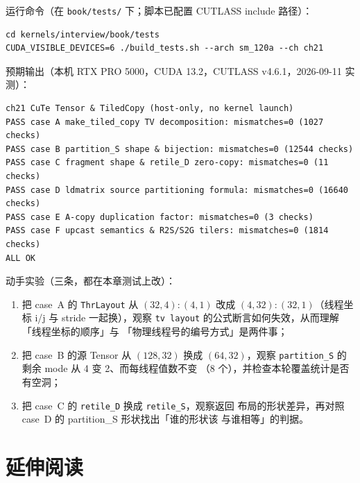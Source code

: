 运行命令（在 \texttt{book/tests/} 下；脚本已配置 CUTLASS include 路径）：

\begin{lstlisting}[style=console]
cd kernels/interview/book/tests
CUDA_VISIBLE_DEVICES=6 ./build_tests.sh --arch sm_120a --ch ch21
\end{lstlisting}

预期输出（本机 RTX PRO 5000，CUDA 13.2，CUTLASS v4.6.1，2026-09-11 实测）：

\begin{lstlisting}[style=console]
ch21 CuTe Tensor & TiledCopy (host-only, no kernel launch)
PASS case A make_tiled_copy TV decomposition: mismatches=0 (1027 checks)
PASS case B partition_S shape & bijection: mismatches=0 (12544 checks)
PASS case C fragment shape & retile_D zero-copy: mismatches=0 (11 checks)
PASS case D ldmatrix source partitioning formula: mismatches=0 (16640 checks)
PASS case E A-copy duplication factor: mismatches=0 (3 checks)
PASS case F upcast semantics & R2S/S2G tilers: mismatches=0 (1814 checks)
ALL OK
\end{lstlisting}

动手实验（三条，都在本章测试上改）：

\begin{enumerate}
  \item 把 case~A 的 \texttt{ThrLayout} 从 $(32,4){:}(4,1)$ 改成
        $(4,32){:}(32,1)$（线程坐标 i/j 与 stride 一起换），观察
        \texttt{tv layout} 的公式断言如何失效，从而理解「线程坐标的顺序」与
        「物理线程号的编号方式」是两件事；
  \item 把 case~B 的源 Tensor 从 $(128,32)$ 换成 $(64,32)$，观察
        \texttt{partition\_S} 的剩余 mode 从 4 变 2、而每线程值数不变
        （8 个），并检查本轮覆盖统计是否有空洞；
  \item 把 case~C 的 \texttt{retile\_D} 换成 \texttt{retile\_S}，观察返回
        布局的形状差异，再对照 case~D 的 partition\_S 形状找出「谁的形状该
        与谁相等」的判据。
\end{enumerate}

\section*{延伸阅读}

